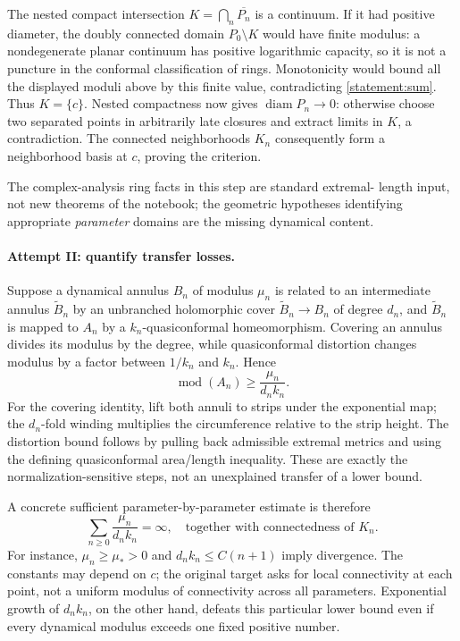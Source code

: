 \documentclass[11pt,a4paper]{article}
\numberwithin{equation}{section}
\begin{document}
The nested compact intersection $K=\bigcap_n\overline{P_n}$ is a
continuum.  If it had positive diameter, the doubly connected domain
$P_0\setminus K$ would have finite modulus: a nondegenerate planar
continuum has positive logarithmic capacity, so it is not a puncture
in the conformal classification of rings.  Monotonicity would bound
all the displayed moduli above by this finite value, contradicting
\eqref{statement:sum}.  Thus $K=\{c\}$.  Nested compactness now gives
$\operatorname{diam}P_n\to0$: otherwise choose two separated points
in arbitrarily late closures and extract limits in $K$, a contradiction.
The connected neighborhoods $K_n$ consequently form a neighborhood
basis at $c$, proving the criterion.

The complex-analysis ring facts in this step are standard extremal-
length input, not new theorems of the notebook; the geometric
hypotheses identifying appropriate \emph{parameter} domains are the
missing dynamical content.

\paragraph{Attempt II: quantify transfer losses.}
Suppose a dynamical annulus $B_n$ of modulus $\mu_n$ is related to an
intermediate annulus $\widetilde B_n$ by an unbranched holomorphic
cover $\widetilde B_n\to B_n$ of degree $d_n$, and $\widetilde B_n$ is mapped to $A_n$ by a
$k_n$-quasiconformal homeomorphism.  Covering an annulus divides its
modulus by the degree, while quasiconformal distortion changes modulus
by a factor between $1/k_n$ and $k_n$.  Hence
\begin{equation}\label{statement:loss}
 \operatorname{mod}(A_n)\geq\frac{\mu_n}{d_n k_n}.
\end{equation}
For the covering identity, lift both annuli to strips under the
exponential map; the $d_n$-fold winding multiplies the circumference
relative to the strip height.  The distortion bound follows by pulling
back admissible extremal metrics and using the defining quasiconformal
area/length inequality.  These are exactly the normalization-sensitive
steps, not an unexplained transfer of a lower bound.

A concrete sufficient parameter-by-parameter estimate is therefore
\begin{equation}\label{statement:target}
 \sum_{n\geq0}\frac{\mu_n}{d_n k_n}=\infty,
 \quad\text{together with connectedness of }K_n.
\end{equation}
For instance, $\mu_n\geq\mu_*>0$ and
$d_nk_n\leq C(n+1)$ imply divergence.  The constants may depend on
$c$; the original target asks for local connectivity at each point,
not a uniform modulus of connectivity across all parameters.
Exponential growth of $d_nk_n$, on the other hand, defeats this
particular lower bound even if every dynamical modulus exceeds one
fixed positive number.
\end{document}
